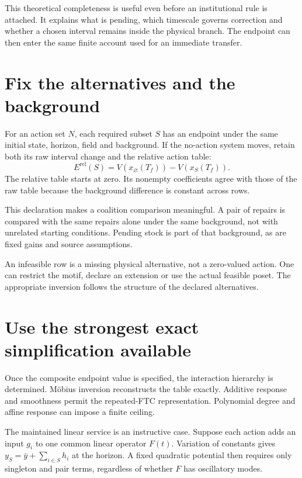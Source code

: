 This theoretical completeness is useful even before an institutional rule is attached. It explains what is pending, which timescale governs correction and whether a chosen interval remains inside the physical branch. The endpoint can then enter the same finite account used for an immediate transfer.

\section{Fix the alternatives and the background}
For an action set $N$, each required subset $S$ has an endpoint under the same initial state, horizon, field and background. If the no-action system moves, retain both its raw interval change and the relative action table:
\begin{equation}
 E^{\mathrm{rel}}(S)=V(x_\varnothing(T_f))-V(x_S(T_f)).
\end{equation}
The relative table starts at zero. Its nonempty coefficients agree with those of the raw table because the background difference is constant across rows.

This declaration makes a coalition comparison meaningful. A pair of repairs is compared with the same repairs alone under the same background, not with unrelated starting conditions. Pending stock is part of that background, as are fixed gains and source assumptions.

An infeasible row is a missing physical alternative, not a zero-valued action. One can restrict the motif, declare an extension or use the actual feasible poset. The appropriate inversion follows the structure of the declared alternatives.

\section{Use the strongest exact simplification available}
Once the composite endpoint value is specified, the interaction hierarchy is determined. Möbius inversion reconstructs the table exactly. Additive response and smoothness permit the repeated-FTC representation. Polynomial degree and affine response can impose a finite ceiling.

The maintained linear service is an instructive case. Suppose each action adds an input $g_i$ to one common linear operator $F(t)$. Variation of constants gives $y_S=\bar y+\sum_{i\in S}h_i$ at the horizon. A fixed quadratic potential then requires only singleton and pair terms, regardless of whether $F$ has oscillatory modes.

